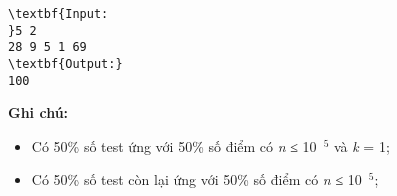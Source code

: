 \begin{verbatim}
\textbf{Input:
}5 2
28 9 5 1 69
\textbf{Output:}
100
\end{verbatim}

\textbf{Ghi chú:}
\begin{itemize}
	\item Có 50\% số test ứng với 50\% số điểm có \emph{n }≤ 10 $^5$ và \emph{k }= 1;
	\item Có 50\% số test còn lại ứng với 50\% số điểm có \emph{n }≤ 10 $^5$;
\end{itemize}